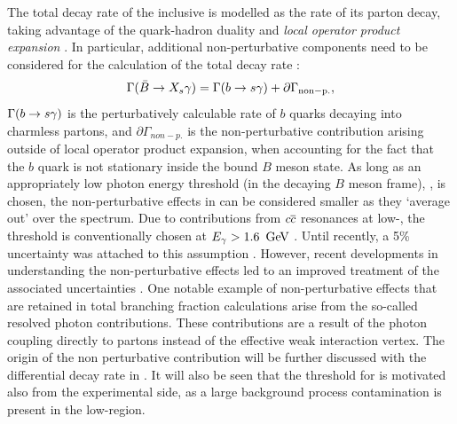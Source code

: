 The total decay rate of the inclusive \BtoXsgamma is modelled as the rate of its parton decay, 
taking advantage of the quark-hadron duality and \textit{local operator product expansion} \cite{Peskin:1995ev,Buchalla:1995vs,Buras:1998raa}.
In particular, additional non-perturbative components need to be considered for the \SM calculation of the total decay rate \cite{Misiak:2015xwa}:
\begin{equation}\label{eq:btosgammarate_nonp}
    \Gamma(\bar{B}\rightarrow X_s\gamma) = \Gamma(b\rightarrow s\gamma) + \partial\Gamma_{\mathrm{non-p.}},
\end{equation}
$\Gamma(b\rightarrow s\gamma)$ is the perturbatively calculable rate of $b$ quarks decaying into charmless partons, 
and $\partial\Gamma_{non-p.}$ is the non-perturbative contribution arising outside of local operator product expansion, when accounting for the fact that the $b$ quark is not stationary inside the bound $B$ meson state.
As long as an appropriately low photon energy threshold (in the decaying $B$ meson frame), \EB, is chosen, the non-perturbative effects in  can be considered smaller as they `average out' over the spectrum.
Due to contributions from $c\overline c$ resonances at low-\Egamma, the threshold is conventionally chosen at ${E_{\gamma}}>1.6~\mathrm{\,Ge\kern -0.1em V}$ \cite{Misiak:2009nr}.
Until recently, a 5\% uncertainty was attached to this assumption \cite{Benzke:2010js}. 
However, recent developments in understanding the non-perturbative effects \cite{Gunawardana:2019gep} led to an improved treatment of the associated uncertainties \cite{Misiak:2020vlo}.
One notable example of non-perturbative effects that are retained in total branching fraction calculations arise from the so-called resolved photon contributions.
These contributions are a result of the photon coupling directly to partons instead of the effective weak interaction vertex.
The origin of the non perturbative contribution will be further discussed with the differential decay rate in .
It will also be seen that the threshold for \EB is motivated also from the experimental side, as a large background process contamination is present in the low-\EB region.

